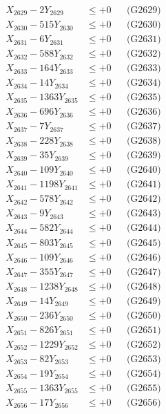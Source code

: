 \documentclass[a4paper,10pt]{article}
\begin{document}
{\begin{align}
X_{2629} - 2Y_{2629} &\leq +0 && \text{(G2629)} \\
X_{2630} - 515Y_{2630} &\leq +0 && \text{(G2630)} \\
\allowbreak
X_{2631} - 6Y_{2631} &\leq +0 && \text{(G2631)} \\
X_{2632} - 588Y_{2632} &\leq +0 && \text{(G2632)} \\
X_{2633} - 164Y_{2633} &\leq +0 && \text{(G2633)} \\
X_{2634} - 14Y_{2634} &\leq +0 && \text{(G2634)} \\
X_{2635} - 1363Y_{2635} &\leq +0 && \text{(G2635)} \\
X_{2636} - 696Y_{2636} &\leq +0 && \text{(G2636)} \\
X_{2637} - 7Y_{2637} &\leq +0 && \text{(G2637)} \\
X_{2638} - 228Y_{2638} &\leq +0 && \text{(G2638)} \\
X_{2639} - 35Y_{2639} &\leq +0 && \text{(G2639)} \\
X_{2640} - 109Y_{2640} &\leq +0 && \text{(G2640)} \\
\allowbreak
X_{2641} - 1198Y_{2641} &\leq +0 && \text{(G2641)} \\
X_{2642} - 578Y_{2642} &\leq +0 && \text{(G2642)} \\
X_{2643} - 9Y_{2643} &\leq +0 && \text{(G2643)} \\
X_{2644} - 582Y_{2644} &\leq +0 && \text{(G2644)} \\
X_{2645} - 803Y_{2645} &\leq +0 && \text{(G2645)} \\
X_{2646} - 109Y_{2646} &\leq +0 && \text{(G2646)} \\
X_{2647} - 355Y_{2647} &\leq +0 && \text{(G2647)} \\
X_{2648} - 1238Y_{2648} &\leq +0 && \text{(G2648)} \\
X_{2649} - 14Y_{2649} &\leq +0 && \text{(G2649)} \\
X_{2650} - 236Y_{2650} &\leq +0 && \text{(G2650)} \\
\allowbreak
X_{2651} - 826Y_{2651} &\leq +0 && \text{(G2651)} \\
X_{2652} - 1229Y_{2652} &\leq +0 && \text{(G2652)} \\
X_{2653} - 82Y_{2653} &\leq +0 && \text{(G2653)} \\
X_{2654} - 19Y_{2654} &\leq +0 && \text{(G2654)} \\
X_{2655} - 1363Y_{2655} &\leq +0 && \text{(G2655)} \\
X_{2656} - 17Y_{2656} &\leq +0 && \text{(G2656)} \\

\end{align}}
\end{document}
